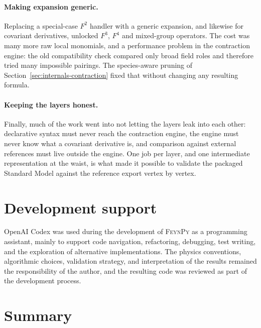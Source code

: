 \paragraph{Making expansion generic.} Replacing a special-case $F^2$ handler with a generic  expansion, and likewise for covariant derivatives, unlocked $F^3$, $F^4$ and mixed-group operators. The cost was many more raw local monomials, and a performance problem in the contraction engine: the old compatibility check compared only broad field roles and therefore tried many impossible pairings. The species-aware pruning of Section~\ref{sec:internals-contraction} fixed that without changing any resulting formula.

\paragraph{Keeping the layers honest.} Finally, much of the work went into not letting the layers leak into each other: declarative syntax must never reach the contraction engine, the engine must never know what a covariant derivative is, and comparison against external references must live outside the engine. One job per layer, and one intermediate representation at the waist, is what made it possible to validate the packaged Standard Model against the reference export vertex by vertex.



\section{Development support}
\label{sec:internals-development-support}

OpenAI Codex was used during the development of \textsc{FeynPy} as a programming assistant, mainly to support code navigation, refactoring, debugging, test writing, and the exploration of alternative implementations.
The physics conventions, algorithmic choices, validation strategy, and interpretation of the results remained the responsibility of the author, and the resulting code was reviewed as part of the development process.
\section{Summary}
\label{sec:internals-summary}

